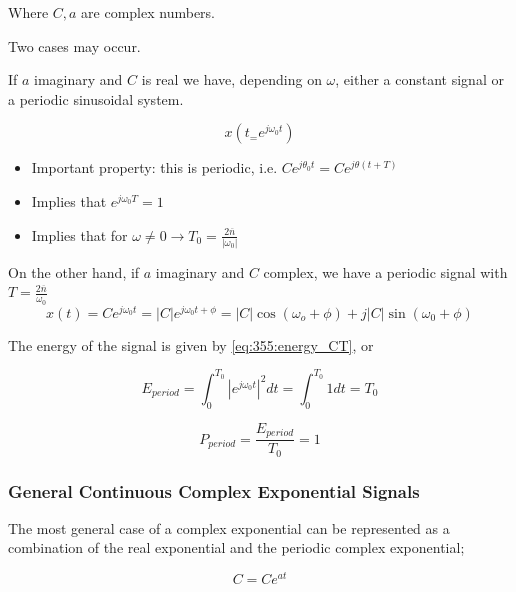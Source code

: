 \documentclass[10pt]{article}
\begin{document}
Where $ C, a $ are complex numbers.

Two cases may occur.

If $ a $ imaginary and $ C $ is real we have, depending on $ \omega $, either a constant signal or a periodic sinusoidal system.

\begin{equation}
	x(t_ = e^{j\omega_0t}) 
\end{equation}

\begin{itemize}
	\item Important property: this is periodic, i.e. $ Ce^{j\theta_0 t} = Ce^{j \theta (t + T)} $ 
	\item Implies that $ e^{j\omega_0T} = 1 $ 
	\item Implies that for $ \omega \neq  0 \rightarrow T_0 = \frac{2 \overline{n}}{|\omega_0|} $ 	
\end{itemize}


On the other hand, if $ a $ imaginary and  $ C $ complex, we have a periodic signal with $ T = \frac{2 \overline{n}}{\omega_0} $ 
\begin{equation}
	x(t) = Ce^{j\omega_0 t} = |C|e^{j\omega_0t + \phi} =  |C| \cos(\omega_o + \phi) + j|C| \sin(\omega_0 + \phi)
\end{equation}


The energy of the signal is given by \eqref{eq:355:energy_CT}, or



\begin{equation}
	E_{period} = \int^{T_0}_0 |e^{j\omega_0 t}|^2 dt = \int^{T_0}_0 1 dt = T_0
\end{equation}


\begin{equation}
	P_{period} = \frac{E_{period}}{T_0} = 1
\end{equation}



\subsubsection{General Continuous Complex Exponential Signals}


The most general case of a complex exponential can be represented as a combination of the real exponential and the periodic complex exponential;

\begin{equation}
		C = Ce^{at}
\end{equation}
\end{document}

